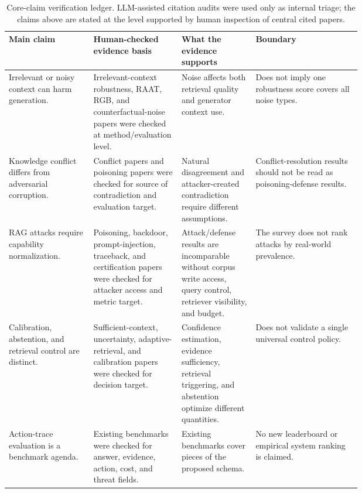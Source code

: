 \documentclass[11pt]{article}
\begin{document}
\begin{table}[t]
\centering
\scriptsize
\renewcommand{\arraystretch}{0.9}
\begin{tabularx}{\linewidth}{>{\raggedright\arraybackslash}p{0.24\linewidth}>{\raggedright\arraybackslash}p{0.25\linewidth}>{\raggedright\arraybackslash}p{0.21\linewidth}X}
\toprule
\textbf{Main claim} & \textbf{Human-checked evidence basis} & \textbf{What the evidence supports} & \textbf{Boundary} \\
\midrule
Irrelevant or noisy context can harm generation. & Irrelevant-context robustness, RAAT, RGB, and counterfactual-noise papers were checked at method/evaluation level. & Noise affects both retrieval quality and generator context use. & Does not imply one robustness score covers all noise types. \\
Knowledge conflict differs from adversarial corruption. & Conflict papers and poisoning papers were checked for source of contradiction and evaluation target. & Natural disagreement and attacker-created contradiction require different assumptions. & Conflict-resolution results should not be read as poisoning-defense results. \\
RAG attacks require capability normalization. & Poisoning, backdoor, prompt-injection, traceback, and certification papers were checked for attacker access and metric target. & Attack/defense results are incomparable without corpus write access, query control, retriever visibility, and budget. & The survey does not rank attacks by real-world prevalence. \\
Calibration, abstention, and retrieval control are distinct. & Sufficient-context, uncertainty, adaptive-retrieval, and calibration papers were checked for decision target. & Confidence estimation, evidence sufficiency, retrieval triggering, and abstention optimize different quantities. & Does not validate a single universal control policy. \\
Action-trace evaluation is a benchmark agenda. & Existing benchmarks were checked for answer, evidence, action, cost, and threat fields. & Existing benchmarks cover pieces of the proposed schema. & No new leaderboard or empirical system ranking is claimed. \\
\bottomrule
\end{tabularx}
\caption{Core-claim verification ledger. LLM-assisted citation audits were used only as internal triage; the claims above are stated at the level supported by human inspection of central cited papers.}
\label{tab:claim-verification-ledger}
\end{table}
\end{document}
